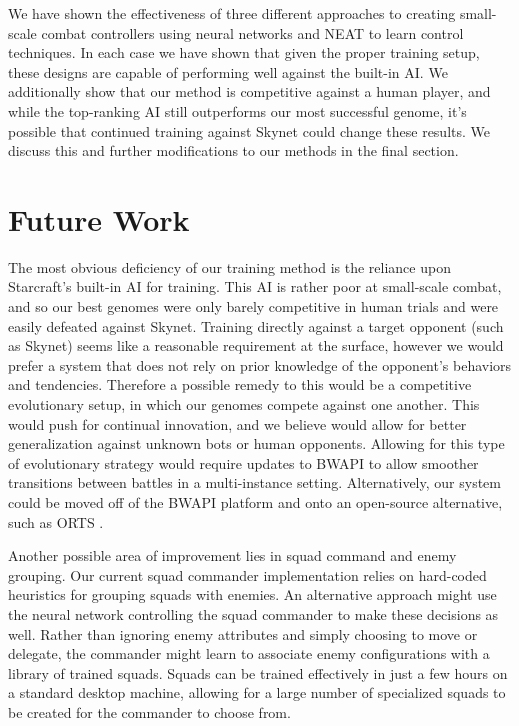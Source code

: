 \documentclass[10pt,a4paper,twocolumn]{article}
\begin{document}
We have shown the effectiveness of three different approaches to creating small-scale combat controllers using neural networks and NEAT to learn control techniques. In each case we have shown that given the proper training setup, these designs are capable of performing well against the built-in AI. We additionally show that our method is competitive against a human player, and while the top-ranking AI still outperforms our most successful genome, it's possible that continued training against Skynet could change these results. We discuss this and further modifications to our methods in the final section.

\section{Future Work}
\label{sec:future}

The most obvious deficiency of our training method is the reliance upon Starcraft's built-in AI for training. This AI is rather poor at small-scale combat, and so our best genomes were only barely competitive in human trials and were easily defeated against Skynet. Training directly against a target opponent (such as Skynet) seems like a reasonable requirement at the surface, however we would prefer a system that does not rely on prior knowledge of the opponent's behaviors and tendencies. Therefore a possible remedy to this would be a competitive evolutionary setup, in which our genomes compete against one another. This would push for continual innovation, and we believe would allow for better generalization against unknown bots or human opponents. Allowing for this type of evolutionary strategy would require updates to BWAPI to allow smoother transitions between battles in a multi-instance setting. Alternatively, our system could be moved off of the BWAPI platform and onto an open-source alternative, such as ORTS \cite{orts}.

Another possible area of improvement lies in squad command and enemy grouping. Our current squad commander implementation relies on hard-coded heuristics for grouping squads with enemies. An alternative approach might use the neural network controlling the squad commander to make these decisions as well. Rather than ignoring enemy attributes and simply choosing to move or delegate, the commander might learn to associate enemy configurations with a library of trained squads. Squads can be trained effectively in just a few hours on a standard desktop machine, allowing for a large number of specialized squads to be created for the commander to choose from.
\end{document}
